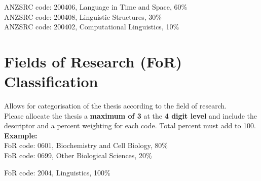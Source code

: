 
ANZSRC code: 200406, Language in Time and Space, 60\% \\
ANZSRC code: 200408, Linguistic Structures, 30\% \\
ANZSRC code: 200402, Computational Linguistics, 10\%



\section*{Fields of Research (FoR) Classification}

\begin{instructional}
    Allows for categorisation of the thesis according to the field of research. \\
    
    \noindent
    Please allocate the thesis a \textbf{maximum of 3} \href{http://www.abs.gov.au/Ausstats/abs@.nsf/Latestproducts/6BB427AB9696C225CA2574180004463E?opendocument}{\color{blue}{Fields of Research (FoR) Codes}} at the \textbf{4 digit level} and include the descriptor and a percent weighting for each code. Total percent must add to 100. \\

\textbf{Example:}\\

FoR code: 0601, Biochemistry and Cell Biology, 80\% \\
\indent FoR code: 0699, Other Biological Sciences, 20\%
\end{instructional}


FoR code: 2004, Linguistics, 100\% \\



